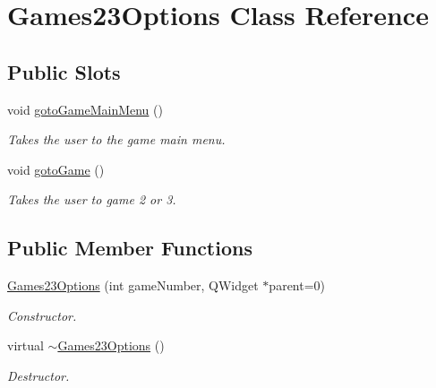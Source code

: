 \hypertarget{classGames23Options}{\section{\-Games23\-Options \-Class \-Reference}
\label{classGames23Options}
}
\subsection*{\-Public \-Slots}
\begin{DoxyCompactItemize}
\item 
void \hyperlink{classGames23Options_a80af1a7ceddf96cf78acf650e386701f}{goto\-Game\-Main\-Menu} ()
\begin{DoxyCompactList}\small\item\em \-Takes the user to the game main menu. \end{DoxyCompactList}\item 
void \hyperlink{classGames23Options_a40d41b00bb2490ada3f727f10ede3bbe}{goto\-Game} ()
\begin{DoxyCompactList}\small\item\em \-Takes the user to game 2 or 3. \end{DoxyCompactList}\end{DoxyCompactItemize}
\subsection*{\-Public \-Member \-Functions}
\begin{DoxyCompactItemize}
\item 
\hyperlink{classGames23Options_ab82f78de4ddeafb212362194bb2cda28}{\-Games23\-Options} (int game\-Number, \-Q\-Widget $\ast$parent=0)
\begin{DoxyCompactList}\small\item\em \-Constructor. \end{DoxyCompactList}\item 
virtual \hyperlink{classGames23Options_a15db206d4e2c7b2328898d7f942abd62}{$\sim$\-Games23\-Options} ()
\begin{DoxyCompactList}\small\item\em \-Destructor. \end{DoxyCompactList}\end{DoxyCompactItemize}


